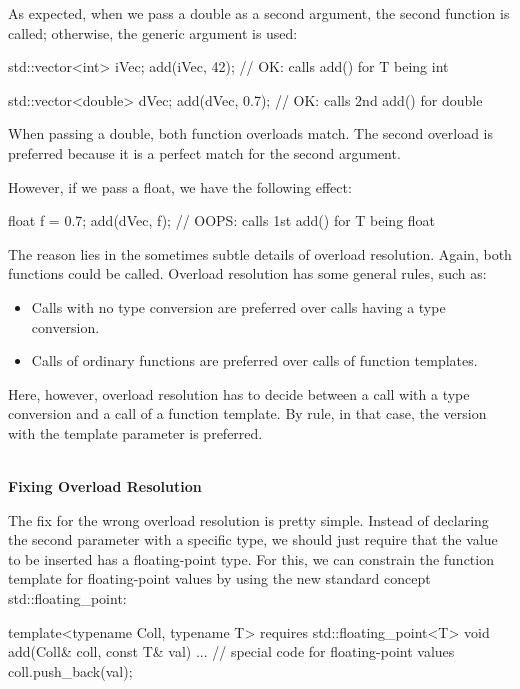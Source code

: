 As expected, when we pass a double as a second argument, the second function is called; otherwise, the generic argument is used:

\begin{cpp}
std::vector<int> iVec;
add(iVec, 42); // OK: calls add() for T being int

std::vector<double> dVec;
add(dVec, 0.7); // OK: calls 2nd add() for double
\end{cpp}

When passing a double, both function overloads match. The second overload is preferred because it is a perfect match for the second argument.

However, if we pass a float, we have the following effect:

\begin{cpp}
float f = 0.7;
add(dVec, f); // OOPS: calls 1st add() for T being float
\end{cpp}

The reason lies in the sometimes subtle details of overload resolution. Again, both functions could be called. Overload resolution has some general rules, such as:

\begin{itemize}
\item
Calls with no type conversion are preferred over calls having a type conversion.

\item
Calls of ordinary functions are preferred over calls of function templates.
\end{itemize}

Here, however, overload resolution has to decide between a call with a type conversion and a call of a function template. By rule, in that case, the version with the template parameter is preferred.

\noindent
\hspace*{\fill} \\ %
\textbf{Fixing Overload Resolution}

The fix for the wrong overload resolution is pretty simple. Instead of declaring the second parameter with a specific type, we should just require that the value to be inserted has a floating-point type. For this, we can constrain the function template for floating-point values by using the new standard concept std::floating\_point:

\begin{cpp}
template<typename Coll, typename T>
requires std::floating_point<T>
void add(Coll& coll, const T& val)
{
	... // special code for floating-point values
	coll.push_back(val);
}
\end{cpp}

